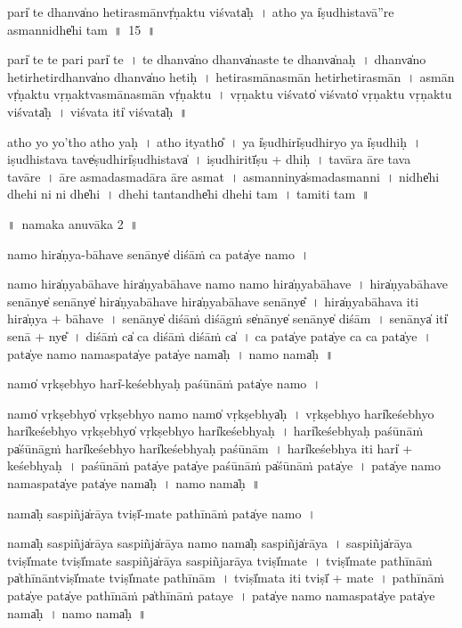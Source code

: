 \documentclass[parskip, DIV=14]{scrartcl}
\begin{document}
{\vspace{0.5cm}
pari̍ te॒ dhanva̍no he॒tira॒smānvṛ̍ṇaktu vi॒śvata̍ḥ~।
atho॒ ya i̍ṣu॒dhistavā॒''re a॒smannidhe̍hi॒ tam~॥~15~॥

pari̍ te te॒ pari pari̍ te~।
te॒ dhanva̍no॒ dhanva̍naste te॒ dhanva̍naḥ~।
dhanva̍no he॒tirhe॒tirdhanva̍no॒ dhanva̍no he॒tiḥ~।
he॒tira॒smāna॒smān he॒tirhe॒tira॒smān~।
a॒smān vṛ̍ṇaktu vṛṇaktva॒smāna॒smān vṛ̍ṇaktu~।
vṛ॒ṇa॒ktu॒ vi॒śvato̍ vi॒śvato̍ vṛṇaktu vṛṇaktu vi॒śvata̍ḥ~।
vi॒śvata॒ iti̍  vi॒śvata̍ḥ~॥ 

atho॒ yo yo'tho॒ atho॒ yaḥ~।
atho॒ ityatho̎~।
ya i̍ṣu॒dhiri̍ṣu॒dhiryo ya i̍ṣu॒dhiḥ~।
i॒ṣu॒dhistava॒ tave̍ṣu॒dhiri̍ṣu॒dhistava̍~।
i॒ṣu॒dhiritī̍ṣu + dhiḥ~।
tavā॒ra ā॒re tava॒ tavā॒re~।
ā॒re a॒smada॒smadā॒ra ā॒re a॒smat~।
a॒smanninya̍smada॒smanni~।
nidhe̍hi dhehi॒ ni ni dhe̍hi~।
dhe॒hi॒ tantandhe̍hi dhehi॒ tam~।
tamiti॒ tam~॥ 

\newpage
\LARGE
॥~namaka anuvāka 2~॥ 
\Large

\vspace{0.5cm}
namo॒ hira̍ṇya-bāhave senā॒nye̍ di॒śāṁ ca॒ pata̍ye॒ namo॒~।

namo॒ hira̍ṇyabāhave॒ hira̍ṇyabāhave॒ namo॒ namo॒ hira̍ṇyabāhave~।
hira̍ṇyabāhave॒ senā॒nye̍ senā॒nye̍ hira̍ṇyabāhave॒ hira̍ṇyabāhave॒ senā॒nye̎~।
hira̍ṇyabāhava॒ iti॒ hira̍ṇya + bā॒ha॒ve॒~।
se॒nā॒nye̍ di॒śāṁ di॒śāgṁ se̍nā॒nye̍ senā॒nye̍ di॒śām~।
se॒nā॒nya̍ iti̍ senā + nye̎~।
di॒śāṁ ca̍ ca di॒śāṁ di॒śāṁ ca̍~।   
ca॒ pata̍ye॒ pata̍ye ca ca॒ pata̍ye~।
pata̍ye॒ namo॒ nama॒spata̍ye॒ pata̍ye॒ nama̍ḥ~।
namo॒ nama̍ḥ~॥ 

\vspace{0.5cm}
namo̍ vṛ॒kṣebhyo॒ hari̍-keśebhyaḥ paśū॒nāṁ pata̍ye॒ namo॒~।

namo̍ vṛ॒kṣebhyo̍ vṛ॒kṣebhyo॒ namo॒ namo̍ vṛ॒kṣebhya̍ḥ~।
vṛ॒kṣebhyo॒ hari̍keśebhyo॒ hari̍keśebhyo vṛ॒kṣebhyo̍ vṛ॒kṣebhyo॒ hari̍keśebhyaḥ~।
hari̍keśebhyaḥ paśū॒nāṁ pa̍śū॒nāgṁ hari̍keśebhyo॒ hari̍keśebhyaḥ paśū॒nām~।
hari̍keśebhya॒ iti॒ hari̍ + ke॒śe॒bhya॒ḥ~।
pa॒śū॒nāṁ pata̍ye॒ pata̍ye paśū॒nāṁ  pa̍śū॒nāṁ pata̍ye~।
pata̍ye॒ namo॒ nama॒spata̍ye॒ pata̍ye॒ nama̍ḥ~।
namo॒ nama̍ḥ~॥ 

\vspace{0.5cm}
nama̍ḥ sa॒spiñja̍rāya॒ tviṣī̍-mate pathī॒nāṁ  pata̍ye॒ namo॒~।

nama̍ḥ sa॒spiñja̍rāya sa॒spiñja̍rāya॒ namo॒ nama̍ḥ sa॒spiñja̍rāya~।
sa॒spiñja̍rāya॒ tviṣī̍mate॒ tviṣī̍mate sa॒spiñja̍rāya sa॒spiñja॒rāya॒ tviṣī̍mate~।
tviṣī̍mate pathī॒nāṁ pa̍thī॒nāntviṣī̍mate॒ tviṣī̍mate pathī॒nām~।
tviṣī̍mata॒ iti॒ tviṣī̍ + ma॒te॒~।
pa॒thī॒nāṁ pata̍ye॒ pata̍ye pathī॒nāṁ pa̍thī॒nāṁ pataye~।
pata̍ye॒ namo॒ nama॒spata̍ye॒ pata̍ye॒ nama̍ḥ~।
namo॒ nama̍ḥ~॥ 

}
\end{document}
